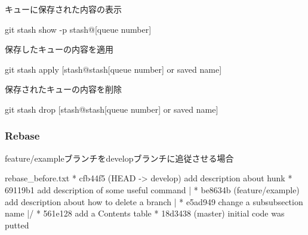 \documentclass[10pt,a4j,openany,dvipdfmx]{jsarticle}
\begin{document}
キューに保存された内容の表示
\begin{commandshell}
git stash show -p stash@{[queue number]}
\end{commandshell}

保存したキューの内容を適用
\begin{commandshell}
git stash apply [stash@{stash[queue number]} or saved name]
\end{commandshell}

保存されたキューの内容を削除
\begin{commandshell}
git stash drop [stash@{stash[queue number]} or saved name]
\end{commandshell}

\subsubsection{Rebase} %
\label{ssub:rebase}



feature/exampleブランチをdevelopブランチに追従させる場合
\begin{filecontents}{rebase_before.txt}
* cfb44f5 (HEAD -> develop) add description about hunk
* 69119b1 add description of some useful command
| * be8634b (feature/example) add description about how to delete a branch
| * e5ad949 change a subsubsection name
|/  
* 561e128 add a Contents table
* 18d3438 (master) initial code was putted
\end{filecontents}

\end{document}
